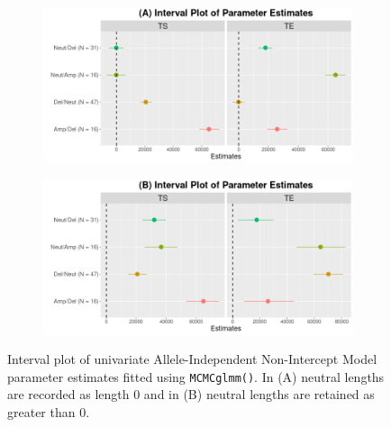 \begin{figure}[!htb]
\vspace{0.5cm}
     \begin{subfigure}[t]{.49\textwidth}
      \centering
      \includegraphics[width = 1\textwidth]{../figures/Chapter_5/Univariate_MCMC_6_AI_Interval.png}
    \end{subfigure}%
     \begin{subfigure}[t]{.49\textwidth}
      \centering
       \includegraphics[width = 1\textwidth]{../figures/Chapter_5/Univariate_MCMC_6_Neut_AI_Interval.png}
    \end{subfigure} 
     \caption[Interval plot of univariate Allele-Independent Non-Intercept Model parameter estimates fitted using \texttt{MCMCglmm()}.]{Interval plot of univariate Allele-Independent Non-Intercept Model parameter estimates fitted using \texttt{MCMCglmm()}. In (A) neutral lengths are recorded as length 0 and in (B) neutral lengths are retained as greater than 0.}
\end{figure}

